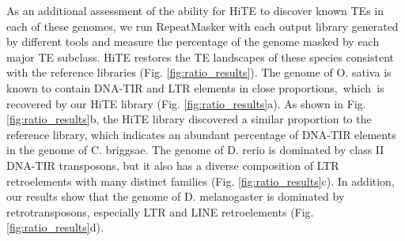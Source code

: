 \documentclass{bmcart}
\begin{document}
As an additional assessment of the ability for HiTE to discover known TEs in each of these genomes, we run RepeatMasker with each output library generated by different tools and measure the percentage of the genome masked by each major TE subclass. HiTE restores the TE landscapes of these species consistent with the reference libraries (Fig. \ref{fig:ratio_results}). The genome of O. sativa is known to contain DNA-TIR and LTR elements in close proportions\cite{ou2019benchmarking}, which is recovered by our HiTE library (Fig. \ref{fig:ratio_results}a). As shown in Fig. \ref{fig:ratio_results}b, the HiTE library discovered a similar proportion to the reference library, which indicates an abundant percentage of DNA-TIR elements in the genome of C. briggsae\cite{harris1988sequence}. The genome of D. rerio is dominated by class II DNA-TIR transposons, but it also has a diverse composition of LTR retroelements with many distinct families (Fig. \ref{fig:ratio_results}c)\cite{howe2013zebrafish}. In addition, our results show that the genome of D. melanogaster is dominated by retrotransposons, especially LTR and LINE retroelements (Fig. \ref{fig:ratio_results}d)\cite{lerat2003sequence}. 


\end{document}
